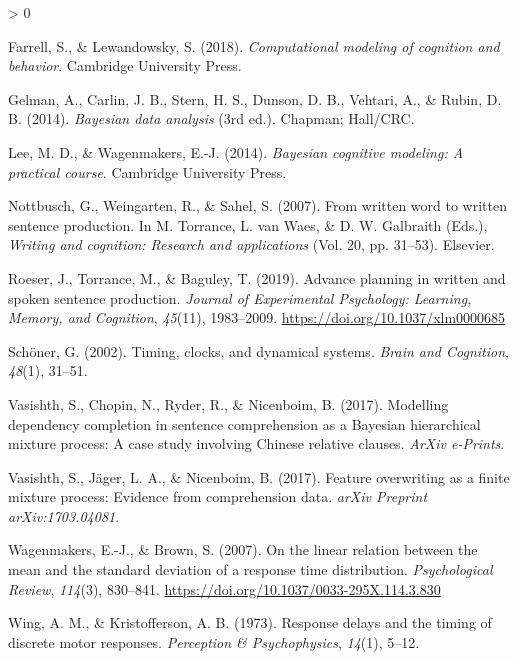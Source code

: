 \documentclass[
  english,
  man,floatsintext]{apa7}
\newlength{\cslhangindent}
\newenvironment{CSLReferences}[2] %
 {%
  \setlength{\parindent}{0pt}
  \ifodd #1 \everypar{\setlength{\hangindent}{\cslhangindent}}\ignorespaces\fi
  \ifnum #2 > 0
  \setlength{\parskip}{#2\baselineskip}
  \fi
 }%
 {}
\begin{document}
\begin{appendix}
\hypertarget{refs}{}
\begin{CSLReferences}{1}{0}
\leavevmode\hypertarget{ref-farrell2018computational}{}%
Farrell, S., \& Lewandowsky, S. (2018). \emph{Computational modeling of
cognition and behavior}. Cambridge University Press.

\leavevmode\hypertarget{ref-gelman2014}{}%
Gelman, A., Carlin, J. B., Stern, H. S., Dunson, D. B., Vehtari, A., \&
Rubin, D. B. (2014). \emph{Bayesian data analysis} (3rd ed.). Chapman;
Hall/CRC.

\leavevmode\hypertarget{ref-lee2014bayesian}{}%
Lee, M. D., \& Wagenmakers, E.-J. (2014). \emph{Bayesian cognitive
modeling: A practical course}. Cambridge University Press.

\leavevmode\hypertarget{ref-not07}{}%
Nottbusch, G., Weingarten, R., \& Sahel, S. (2007). From written word to
written sentence production. In M. Torrance, L. van Waes, \& D. W.
Galbraith (Eds.), \emph{Writing and cognition: Research and
applications} (Vol. 20, pp. 31--53). Elsevier.

\leavevmode\hypertarget{ref-roeser2018advance}{}%
Roeser, J., Torrance, M., \& Baguley, T. (2019). Advance planning in
written and spoken sentence production. \emph{Journal of Experimental
Psychology: Learning, Memory, and Cognition}, \emph{45}(11), 1983--2009.
\url{https://doi.org/10.1037/xlm0000685}

\leavevmode\hypertarget{ref-schoner2002timing}{}%
Schöner, G. (2002). Timing, clocks, and dynamical systems. \emph{Brain
and Cognition}, \emph{48}(1), 31--51.

\leavevmode\hypertarget{ref-vasishth2017}{}%
Vasishth, S., Chopin, N., Ryder, R., \& Nicenboim, B. (2017). Modelling
dependency completion in sentence comprehension as a {B}ayesian
hierarchical mixture process: {A} case study involving {C}hinese
relative clauses. \emph{ArXiv e-Prints}.

\leavevmode\hypertarget{ref-vasishth2017feature}{}%
Vasishth, S., Jäger, L. A., \& Nicenboim, B. (2017). Feature overwriting
as a finite mixture process: Evidence from comprehension data.
\emph{arXiv Preprint arXiv:1703.04081}.

\leavevmode\hypertarget{ref-wagenmakers2007linear}{}%
Wagenmakers, E.-J., \& Brown, S. (2007). On the linear relation between
the mean and the standard deviation of a response time distribution.
\emph{Psychological Review}, \emph{114}(3), 830--841.
\url{https://doi.org/10.1037/0033-295X.114.3.830}

\leavevmode\hypertarget{ref-wing1973response}{}%
Wing, A. M., \& Kristofferson, A. B. (1973). Response delays and the
timing of discrete motor responses. \emph{Perception \& Psychophysics},
\emph{14}(1), 5--12.

\end{CSLReferences}
\end{appendix}
\end{document}
